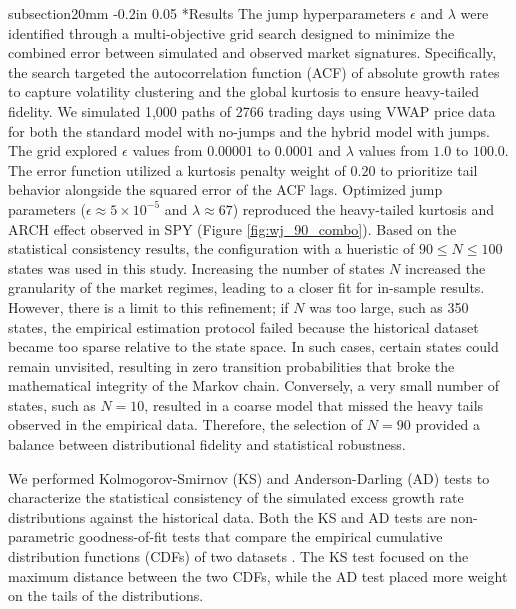 \documentclass[12pt, letterpaper]{article}
\makeatletter
\renewcommand\section{\@startsection
	{subsection}{2}{0mm}
	{-0.2in}
	{0.05\baselineskip}
	{\normalfont\large\bfseries}}
\makeatother
\begin{document}
\section*{Results}\label{sec:results}
The jump hyperparameters $\epsilon$ and $\lambda$ were identified through a multi-objective grid search designed to minimize the combined error between simulated and observed market signatures. Specifically, the search targeted the autocorrelation function (ACF) of absolute growth rates to capture volatility clustering and the global kurtosis to ensure heavy-tailed fidelity. 
We simulated 1,000 paths of 2766 trading days using VWAP price data for both the standard model with no-jumps and the hybrid model with jumps. The grid explored $\epsilon$ values from $0.00001$ to $0.0001$ and $\lambda$ values from $1.0$ to $100.0$. The error function utilized a kurtosis penalty weight of $0.20$ to prioritize tail behavior alongside the squared error of the ACF lags. Optimized jump parameters ($\epsilon \approx 5 \times 10^{-5}$ and $\lambda \approx 67$) reproduced the heavy-tailed kurtosis and ARCH effect observed in SPY (Figure \ref{fig:wj_90_combo}). Based on the statistical consistency results, the configuration with a hueristic of $90\leq{N}\leq{100}$ states was used in this study. Increasing the number of states $N$ increased the granularity of the market regimes, leading to a closer fit for in-sample results. However, there is a limit to this refinement; if $N$ was too large, such as 350 states, the empirical estimation protocol failed because the historical dataset became too sparse relative to the state space. In such cases, certain states could remain unvisited, resulting in zero transition probabilities that broke the mathematical integrity of the Markov chain. Conversely, a very small number of states, such as $N=10$, resulted in a coarse model that missed the heavy tails observed in the empirical data. Therefore, the selection of $N=90$ provided a balance between distributional fidelity and statistical robustness. 

We performed Kolmogorov-Smirnov (KS) and Anderson-Darling (AD) tests to characterize the statistical consistency of the simulated excess growth rate distributions against the historical data. Both the KS and AD tests are non-parametric goodness-of-fit tests that compare the empirical cumulative distribution functions (CDFs) of two datasets \cite{kolmogorov_1933, smirnov_1948, anderson_darling_1952}. The KS test focused on the maximum distance between the two CDFs, while the AD test placed more weight on the tails of the distributions.
\end{document}
